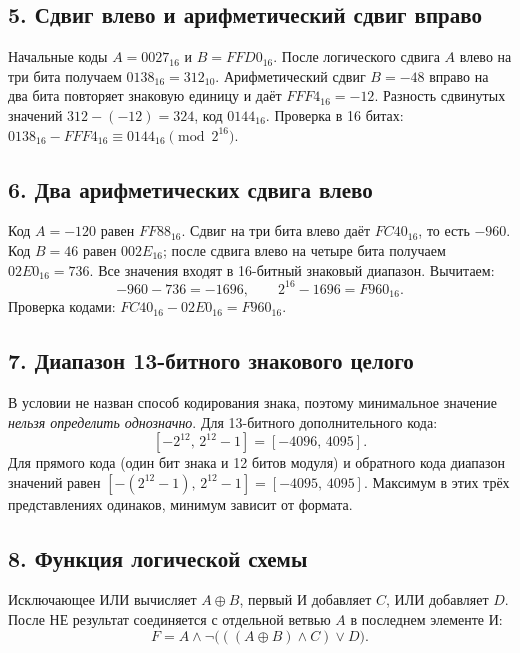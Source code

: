 \subsection*{5. Сдвиг влево и арифметический сдвиг вправо}
Начальные коды $A=0027_{16}$ и $B=FFD0_{16}$. После логического сдвига $A$ влево на три бита получаем $0138_{16}=312_{10}$. Арифметический сдвиг $B=-48$ вправо на два бита повторяет знаковую единицу и даёт $FFF4_{16}=-12$. Разность сдвинутых значений $312-(-12)=324$, код $\boxed{0144_{16}}$.
Проверка в 16 битах: $0138_{16}-FFF4_{16}\equiv0144_{16}\pmod{2^{16}}$.

\subsection*{6. Два арифметических сдвига влево}
Код $A=-120$ равен $FF88_{16}$. Сдвиг на три бита влево даёт $FC40_{16}$, то есть $-960$. Код $B=46$ равен $002E_{16}$; после сдвига влево на четыре бита получаем $02E0_{16}=736$. Все значения входят в 16-битный знаковый диапазон. Вычитаем:
\[
-960-736=-1696,\qquad
2^{16}-1696=\boxed{F960_{16}}.
\]
Проверка кодами: $FC40_{16}-02E0_{16}=F960_{16}$.

\clearpage
\subsection*{7. Диапазон 13-битного знакового целого}
В условии не назван способ кодирования знака, поэтому минимальное значение \emph{нельзя определить однозначно}. Для 13-битного дополнительного кода:
\[
[-2^{12},\,2^{12}-1]=[-4096,\,4095].
\]
Для прямого кода (один бит знака и 12 битов модуля) и обратного кода диапазон значений равен $[-(2^{12}-1),\,2^{12}-1]=[-4095,\,4095]$. Максимум в этих трёх представлениях одинаков, минимум зависит от формата.

\subsection*{8. Функция логической схемы}
Исключающее ИЛИ вычисляет $A\oplus B$, первый И добавляет $C$, ИЛИ добавляет $D$. После НЕ результат соединяется с отдельной ветвью $A$ в последнем элементе И:
\[
\boxed{F=A\land\lnot\bigl(((A\oplus B)\land C)\lor D\bigr)}.
\]
